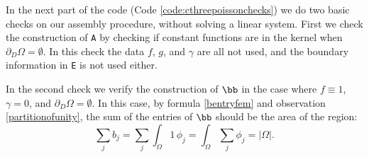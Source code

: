In the next part of the code (Code \ref{code:cthreepoissonchecks}) we do two basic checks on our assembly procedure, without solving a linear system.  First we check the construction of \texttt{A} by checking if constant functions are in the kernel when $\partial_D\Omega=\emptyset$.  In this check the data $f$, $g$, and $\gamma$ are all not used, and the boundary information in \texttt{E} is not used either.


In the second check we verify the construction of $\bb$ in the case where $f\equiv 1$, $\gamma=0$, and $\partial_D\Omega=\emptyset$.  In this case, by formula \eqref{bentryfem} and observation \eqref{partitionofunity}, the sum of the entries of $\bb$ should be the area of the region:
   $$\sum_j b_j = \sum_j \int_\Omega 1\, \phi_j = \int_\Omega \sum_j \phi_j = |\Omega|.$$




